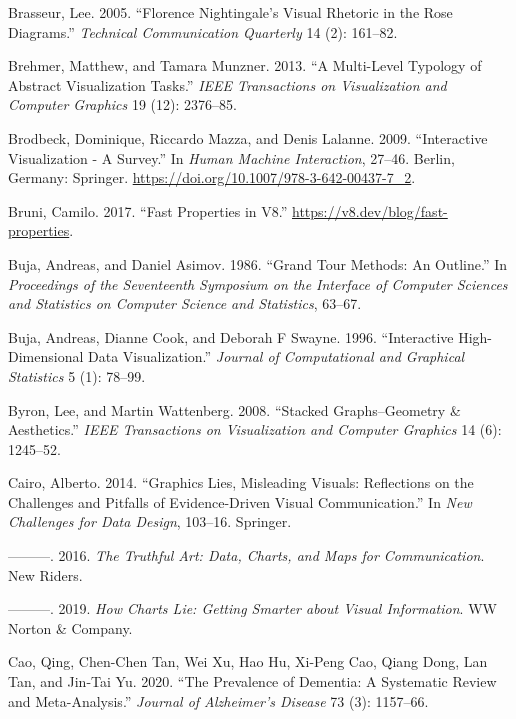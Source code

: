 \documentclass[
]{book}
\newlength{\cslhangindent}
\newenvironment{CSLReferences}[2] %
 {\begin{list}{}{%
  \setlength{\itemindent}{0pt}
  \setlength{\leftmargin}{0pt}
  \setlength{\parsep}{0pt}
  \ifodd #1
   \setlength{\leftmargin}{\cslhangindent}
   \setlength{\itemindent}{-1\cslhangindent}
  \fi
  \setlength{\itemsep}{#2\baselineskip}}}
 {\end{list}}
\theoremstyle{definition}
\theoremstyle{definition}
\theoremstyle{definition}
\theoremstyle{definition}
\theoremstyle{remark}
\begin{document}
\begin{CSLReferences}{1}{0}
Brasseur, Lee. 2005. {``Florence Nightingale's Visual Rhetoric in the Rose Diagrams.''} \emph{Technical Communication Quarterly} 14 (2): 161--82.

Brehmer, Matthew, and Tamara Munzner. 2013. {``A Multi-Level Typology of Abstract Visualization Tasks.''} \emph{IEEE Transactions on Visualization and Computer Graphics} 19 (12): 2376--85.

Brodbeck, Dominique, Riccardo Mazza, and Denis Lalanne. 2009. {``{Interactive Visualization - A Survey}.''} In \emph{{Human Machine Interaction}}, 27--46. Berlin, Germany: Springer. \url{https://doi.org/10.1007/978-3-642-00437-7_2}.

Bruni, Camilo. 2017. {``Fast Properties in V8.''} \url{https://v8.dev/blog/fast-properties}.

Buja, Andreas, and Daniel Asimov. 1986. {``Grand Tour Methods: An Outline.''} In \emph{Proceedings of the Seventeenth Symposium on the Interface of Computer Sciences and Statistics on Computer Science and Statistics}, 63--67.

Buja, Andreas, Dianne Cook, and Deborah F Swayne. 1996. {``Interactive High-Dimensional Data Visualization.''} \emph{Journal of Computational and Graphical Statistics} 5 (1): 78--99.

Byron, Lee, and Martin Wattenberg. 2008. {``Stacked Graphs--Geometry \& Aesthetics.''} \emph{IEEE Transactions on Visualization and Computer Graphics} 14 (6): 1245--52.

Cairo, Alberto. 2014. {``Graphics Lies, Misleading Visuals: Reflections on the Challenges and Pitfalls of Evidence-Driven Visual Communication.''} In \emph{New Challenges for Data Design}, 103--16. Springer.

---------. 2016. \emph{The Truthful Art: Data, Charts, and Maps for Communication}. New Riders.

---------. 2019. \emph{How Charts Lie: Getting Smarter about Visual Information}. WW Norton \& Company.

Cao, Qing, Chen-Chen Tan, Wei Xu, Hao Hu, Xi-Peng Cao, Qiang Dong, Lan Tan, and Jin-Tai Yu. 2020. {``The Prevalence of Dementia: A Systematic Review and Meta-Analysis.''} \emph{Journal of Alzheimer's Disease} 73 (3): 1157--66.


\end{CSLReferences}
\end{document}
